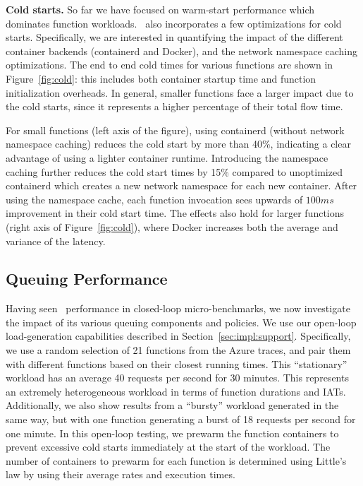 \noindent \textbf{Cold starts.}
So far we have focused on warm-start performance which dominates function workloads.
\sysname~also incorporates a few optimizations for cold starts. 
Specifically, we are interested in quantifying the impact of the different container backends (containerd and Docker), and the network namespace caching optimizations. 
The end to end cold times for various functions are shown in Figure~\ref{fig:cold}: this includes both container startup time and function initialization overheads. 
In general, smaller functions face a larger impact due to the cold starts, since it represents a higher percentage of their total flow time. 


For small functions (left axis of the figure), using containerd (without network namespace caching) reduces the cold start by more than 40\%, indicating a clear advantage of using a lighter container runtime.
Introducing the namespace caching further reduces the cold start times by 15\% compared to unoptimized containerd which creates a new network namespace for each new container. 
After using the namespace cache, each function invocation sees upwards of $100 ms$ improvement in their cold start time.
%
The effects also hold for larger functions (right axis of Figure~\ref{fig:cold}), where Docker increases both the average and variance of the latency. 

\subsection{Queuing Performance}
\label{sec:eval:q}

Having seen \sysname~performance in closed-loop micro-benchmarks, we now investigate the impact of its various queuing components and policies.
We use our open-loop load-generation capabilities described in Section~\ref{sec:impl:support}.
Specifically, we use a random selection of 21 functions from the Azure traces, and pair them with different functions based on their closest running times.
This ``stationary'' workload has an average 40 requests per second for 30 minutes. 
This represents an extremely heterogeneous workload in terms of function durations and IATs.
Additionally, we also show results from a ``bursty'' workload generated in the same way, but with one function generating a burst of 18 requests per second for one minute.
In this open-loop testing, we prewarm the function containers to prevent excessive cold starts immediately at the start of the workload.
The number of containers to prewarm for each function is determined using Little's law by using their average rates and execution times. 

